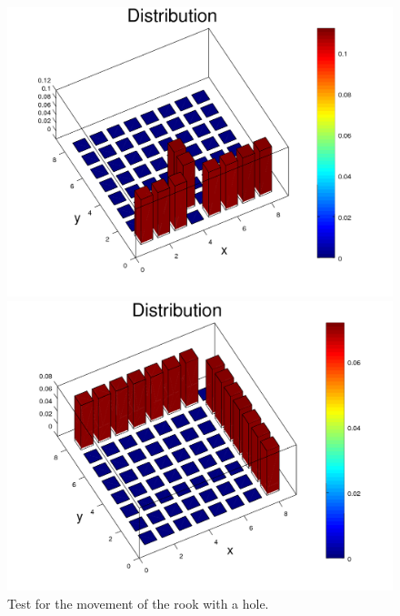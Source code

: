 \documentclass{amsart}
\numberwithin{equation}{section}
\begin{document}
\begin{figure}[!h]
   \begin{minipage}{0.50\textwidth}
     \centering
     \includegraphics[width=1.0\linewidth]{figures/withHole/figure_Rook_moveFixedOrigin_N1000000_x4_y1.png}
     \captionsetup{labelformat=empty}
     \caption*{$n=1,000,000$}
    \end{minipage}\hfil
   \begin{minipage}{0.50\textwidth}
     \centering
     \includegraphics[width=1.0\linewidth]{figures/withHole/figure_Rook_moveFixedOrigin_N1000000_x8_y8.png}
     \captionsetup{labelformat=empty}
     \caption*{$n=1,000,000$}
   \end{minipage}\hfil
    \caption{Test for the movement of the rook with a hole.}
    \label{plots:graphs_testing_withHole}
\end{figure}
\end{document}
